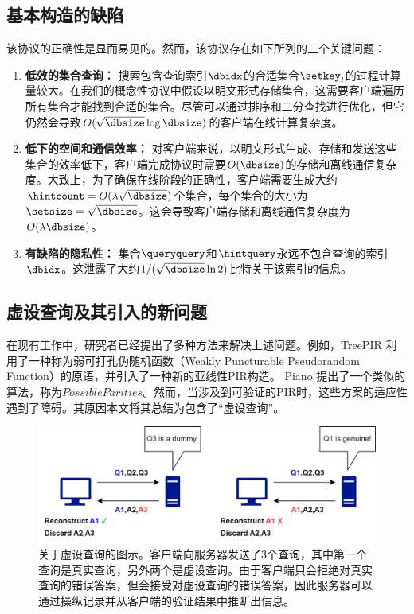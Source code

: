 \subsection{基本构造的缺陷}
该协议的正确性是显而易见的。然而，该协议存在如下所列的三个关键问题：

\begin{enumerate}
\item \textbf{低效的集合查询：} 搜索包含查询索引$\dbidx$的合适集合$\setkey_t$的过程计算量较大。在我们的概念性协议中假设以明文形式存储集合，这需要客户端遍历所有集合才能找到合适的集合。尽管可以通过排序和二分查找进行优化，但它仍然会导致$O(\sqrt{\dbsize}\log \dbsize)$的客户端在线计算复杂度。
\item \textbf{低下的空间和通信效率：} 对客户端来说，以明文形式生成、存储和发送这些集合的效率低下，客户端完成协议时需要$O(\dbsize)$的存储和离线通信复杂度。大致上，为了确保在线阶段的正确性，客户端需要生成大约$\hintcount = O(\lambda\sqrt{\dbsize})$个集合，每个集合的大小为$\setsize = \sqrt{\dbsize}$。这会导致客户端存储和离线通信复杂度为$O(\lambda\dbsize)$。
\item \textbf{有缺陷的隐私性：} 集合$\queryquery$和$\hintquery$永远不包含查询的索引$\dbidx$。这泄露了大约$1/(\sqrt{\dbsize}\ln 2)$比特关于该索引的信息。
\end{enumerate}

\subsection{虚设查询及其引入的新问题}
在现有工作中，研究者已经提出了多种方法来解决上述问题。例如，TreePIR \cite{C:LazPap23} 利用了一种称为弱可打孔伪随机函数（Weakly Puncturable Pseudorandom Function）的原语，并引入了一种新的亚线性PIR构造。 Piano \cite{Piano} 提出了一个类似的算法，称为$PossibleParities$。然而，当涉及到可验证的PIR时，这些方案的适应性遇到了障碍。其原因本文将其总结为包含了“虚设查询”。

\begin{figure}
    \centering
    \includegraphics[width=1\linewidth]{figure/dummy.png}
    \caption{关于虚设查询的图示。客户端向服务器发送了3个查询，其中第一个查询是真实查询，另外两个是虚设查询。由于客户端只会拒绝对真实查询的错误答案，但会接受对虚设查询的错误答案，因此服务器可以通过操纵记录并从客户端的验证结果中推断出信息。}
    \label{fig:dummy}
\end{figure}

